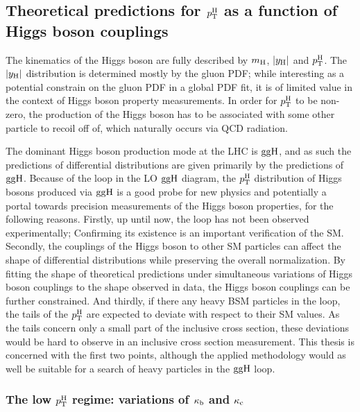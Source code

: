 \subsection{Theoretical predictions for \texorpdfstring{$p_\mathrm{T}^\mathrm{H}$}{pTH} as a function of Higgs boson couplings}


The kinematics of the Higgs boson are fully described by $m_{\mathrm{H}}$, $\left|y_\mathrm{H}\right| $ and $p_\mathrm{T}^\mathrm{H}$.
% 
The $\left|y_\mathrm{H}\right| $ distribution is determined mostly by the gluon PDF; while interesting as a potential constrain on the gluon PDF in a global PDF fit, it is of limited value in the context of Higgs boson property measurements.
% 
In order for $p_\mathrm{T}^\mathrm{H}$ to be non-zero, the production of the Higgs boson has to be associated with some other particle to recoil off of, which naturally occurs via QCD radiation.


The dominant Higgs boson production mode at the LHC is $\mathrm{g}\mathrm{g}\mathrm{H}$, and as such the predictions of differential distributions are given primarily by the predictions of $\mathrm{g}\mathrm{g}\mathrm{H}$.
% 
Because of the loop in the LO $\mathrm{g}\mathrm{g}\mathrm{H}$ diagram, the $p_\mathrm{T}^\mathrm{H}$ distribution of Higgs bosons produced via $\mathrm{g}\mathrm{g}\mathrm{H}$ is a good probe for new physics and potentially a portal towards precision measurements of the Higgs boson properties, for the following reasons.
% 
Firstly, up until now, the loop has not been observed experimentally; Confirming its existence is an important verification of the SM.
% 
Secondly, the couplings of the Higgs boson to other SM particles can affect the shape of differential distributions while preserving the overall normalization.
% 
By fitting the shape of theoretical predictions under simultaneous variations of Higgs boson couplings to the shape observed in data, the Higgs boson couplings can be further constrained.
% 
And thirdly, if there any heavy BSM particles in the loop, the tails of the $p_\mathrm{T}^\mathrm{H}$ are expected to deviate with respect to their SM values.
% 
As the tails concern only a small part of the inclusive cross section, these deviations would be hard to observe in an inclusive cross section measurement.
% 
This thesis is concerned with the first two points, although the applied methodology would as well be suitable for a search of heavy particles in the $\mathrm{g}\mathrm{g}\mathrm{H}$ loop.


\subsubsection{The low \texorpdfstring{$p_\mathrm{T}^\mathrm{H}$}{pTH} regime: variations of $\kappa_{\mathrm{b}}$ and $\kappa_{\mathrm{c}}$}

